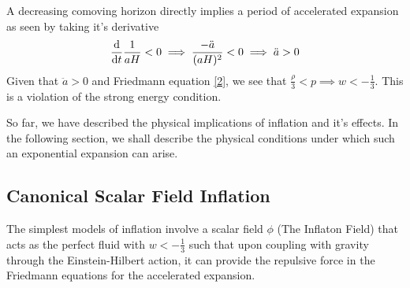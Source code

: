 \documentclass[aps,prd,reprint,preprintnumbers,showpacs,floatfix,nofootinbib,superscript address]{revtex4-2}
\begin{document}
A decreasing comoving horizon directly implies a period of accelerated expansion as seen by taking it's derivative
\begin{equation}
    \frac{\mathrm{d}}{\mathrm{d}t} \frac{1}{aH} <  0 \implies \frac{-\Ddot{a}}{(aH)^2} < 0 \implies \ddot{a} > 0
\end{equation}
Given that $\ddot{a} > 0$ and Friedmann equation \ref{2}, we see that $\frac{\rho}{3} < p \implies w < - \frac{1}{3}$. This is a violation of the strong energy condition.

So far, we have described the physical implications of inflation and it's effects. In the following section, we shall describe the physical conditions under which such an exponential expansion can arise. 

\subsection{Canonical Scalar Field Inflation} \label{Canonical Scalar Field Inflation}
The simplest models of inflation involve a scalar field $\phi$ (The Inflaton Field) that acts as the perfect fluid with $w < -\frac{1}{3}$ such that upon coupling with gravity through the Einstein-Hilbert action, it can provide the repulsive force in the Friedmann equations for the accelerated expansion.
\end{document}
